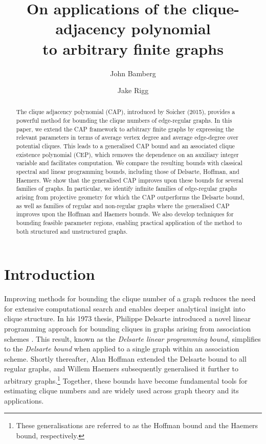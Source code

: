 \documentclass[11pt, baustms]{amsproc}
\title[On applications of the clique-adjacency polynomial]{On applications of the clique-adjacency polynomial\\ to arbitrary finite graphs}
\author{John Bamberg \orcidlink{0000-0001-7347-8687}}
\author{Jake Rigg \orcidlink{0009-0006-4786-027X}}
\date{}
\theoremstyle{scplain}
\begin{document}
\begin{abstract}
The clique adjacency polynomial (CAP), introduced by Soicher (2015), provides a powerful method for bounding the clique numbers of edge-regular graphs. In this paper, we extend the CAP framework to arbitrary finite graphs by expressing the relevant parameters in terms of average vertex degree and average edge-degree over potential cliques. This leads to a generalised CAP bound and an associated clique existence polynomial (CEP), which removes the dependence on an auxiliary integer variable and facilitates computation.
We compare the resulting bounds with classical spectral and linear programming bounds, including those of Delsarte, Hoffman, and Haemers. We show that the generalised CAP improves upon these bounds for several families of graphs. In particular, we identify infinite families of edge-regular graphs arising from projective geometry for which the CAP outperforms the Delsarte bound, as well as families of regular and non-regular graphs where the generalised CAP improves upon the Hoffman and Haemers bounds. We also develop techniques for bounding feasible parameter regions, enabling practical application of the method to both structured and unstructured graphs.
\end{abstract}

\vspace*{-1cm}
\maketitle



\section{Introduction}

Improving methods for bounding the clique number of a graph reduces the need for extensive computational search and enables deeper analytical insight into clique structure. In his 1973 thesis, Philippe Delsarte introduced a novel linear programming approach for bounding cliques in graphs arising from association schemes \cite{delsarte}. This result, known as the \emph{Delsarte linear programming bound}, simplifies to the \emph{Delsarte bound} when applied to a single graph within an association scheme. Shortly thereafter, Alan Hoffman extended the Delsarte bound to all regular graphs, and Willem Haemers subsequently generalised it further to arbitrary graphs.\footnote{These generalisations are referred to as the Hoffman bound and the Haemers bound, respectively.} Together, these bounds have become fundamental tools for estimating clique numbers and are widely used across graph theory and its applications.
\end{document}
